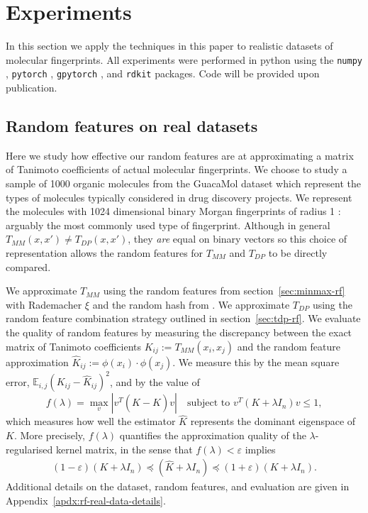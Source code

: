 \documentclass{article}
\theoremstyle{plain}
\theoremstyle{definition}
\theoremstyle{remark}
\newcommand{\eq}[1]{\begin{align*}#1\end{align*}}
\begin{document}
 












\section{Experiments}\label{sec:experiments}

In this section we apply the techniques in this paper to realistic datasets of molecular fingerprints.
All experiments were performed in python using the
\texttt{numpy} \citep{harris2020array},
\texttt{pytorch} \citep{paszke2019pytorch},
\texttt{gpytorch} \citep{gardner2018gpytorch},
and \texttt{rdkit} packages.
Code will be provided upon publication.  %

\subsection{Random features on real datasets}\label{sec:expt-rf-on-real-data}

Here we study how effective our random features are at approximating a matrix of Tanimoto coefficients
of actual molecular fingerprints.
We choose to study a sample of 1000
organic molecules from the GuacaMol dataset \citep{brown2019guacamol,mendez2019chembl} %
which represent the types of molecules typically considered in drug discovery projects.
We represent the molecules with 1024 dimensional binary Morgan fingerprints of radius 1 \citep{rogers2010extended}:
arguably the most commonly used type of fingerprint.
Although in general $T_{MM}(x,x')\neq T_{DP}(x,x')$, they \emph{are} equal on binary vectors
so this choice of representation allows the random features for $T_{MM}$ and $T_{DP}$ to be directly compared.

We approximate $T_{MM}$ using the random features from section~\ref{sec:minmax-rf} with Rademacher $\xi$
and the random hash from \citet{ioffe2010improved}.
We approximate $T_{DP}$ using the random feature combination strategy outlined in section~\ref{sec:tdp-rf}.
We evaluate the quality of random features by measuring the discrepancy between the exact matrix of Tanimoto
coefficients $K_{ij}:=T_{MM}(x_i,x_j)$ and the random feature approximation $\widehat{K}_{ij}:=\phi(x_i)\cdot\phi(x_j)$.
We measure this by the mean square error, $\mathbb{E}_{i,j}(K_{ij} - \widehat{K}_{ij})^2$,
and by the value of
\begin{equation}\label{max singlar value metric equation}
    f(\lambda) = \max_v{\left|v^T\left(K-\widehat{K}\right)v\right|}\quad\text{subject to } v^T\left(K+\lambda I_n \right)v \leq 1,
\end{equation}
which measures how well the estimator $\widehat K$ represents the dominant eigenspace of $K$. More precisely, $f(\lambda)$ quantifies the approximation quality of the $\lambda$-regularised kernel matrix, in the sense that $f(\lambda)<\varepsilon$ implies
\eq{
(1-\varepsilon)(K+\lambda I_n) \preceq 
(\widehat K+\lambda I_n) \preceq
(1+\varepsilon)(K+\lambda I_n).
}
Additional details on the dataset, random features, and evaluation are given in Appendix~\ref{apdx:rf-real-data-details}.
\end{document}
